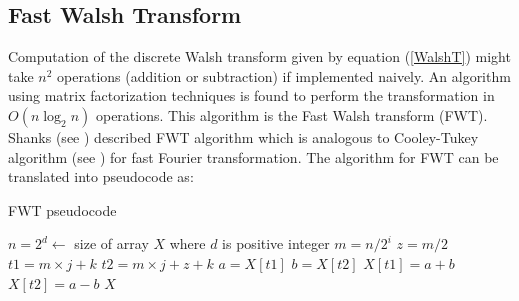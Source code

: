 \subsection{Fast Walsh Transform}
Computation of the discrete Walsh transform given by equation (\ref{WalshT}) might take $n^2$ operations 
(addition or subtraction) if implemented naively.
An algorithm using matrix factorization techniques is found to perform the transformation in $O(n \log_2 n)$ operations.
This algorithm is the Fast Walsh transform (FWT). Shanks (see \cite{Shanks1969}) described FWT algorithm which is analogous to 
Cooley-Tukey algorithm (see \cite{CooleyTukey1965}) for fast Fourier transformation.
The algorithm for FWT can be translated into pseudocode as:
\begin{algorithm}[ht]
\caption{FWT pseudocode}
\label{FWTpseudo}
\begin{algorithmic}[1]

\State $n = 2^d   \gets $  size of array $X$ where $d$ is positive integer
\State $m = n/2^i$
\State $z = m/2$
\State $t1 = m \times j + k$
\State $t2 = m \times j + z +k$
\State $a = X[t1]$
\State $b= X[t2]$
\State $X[t1] = a + b$
\State $X[t2] = a - b$
\EndFor
\EndFor
\EndFor
\State \Return $X$
\EndProcedure
\end{algorithmic}
\end{algorithm}

